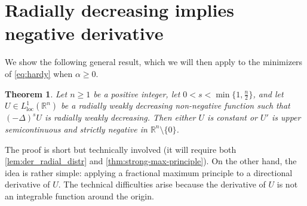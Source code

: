 \documentclass[10pt, reqno]{amsart}
\newcounter{results}[section] %
\theoremstyle{plain}
\newtheorem{theorem}[results]{Theorem}
\theoremstyle{remark}
\theoremstyle{definition}
\numberwithin{equation}{section}
\theoremstyle{plain}
\newcommand{\R}{\ensuremath{\mathbb R}} %
\newcommand{\lapl}{\ensuremath{\Delta}}
\begin{document}
\section{Radially decreasing implies negative derivative}
\label{sec:radial-negative}

We show the following general result, which we will then apply to the minimizers of \cref{eq:hardy} when $\alpha\ge 0$.


\begin{theorem}\label{thm:radial-decreasing-negative-derivative}
    Let $n\ge 1$ be a positive integer, let $0<s<\min\{1, \tfrac n2\}$, and let $U\in L^1_{\mathrm{loc}}(\R^n)$ be a radially weakly decreasing non-negative function such that $(-\lapl)^sU$ is radially weakly decreasing.
    Then either $U$ is constant or $U'$ is upper semicontinuous and \emph{strictly} negative in $\R^n\setminus\{0\}$.
\end{theorem}

The proof is short but technically involved (it will require both \cref{lem:der_radial_distr} and \cref{thm:strong-max-principle}).
On the other hand, the idea is rather simple: applying a fractional maximum principle to a directional derivative of $U$. The technical difficulties arise because the derivative of $U$ is not an integrable function around the origin.
\end{document}
